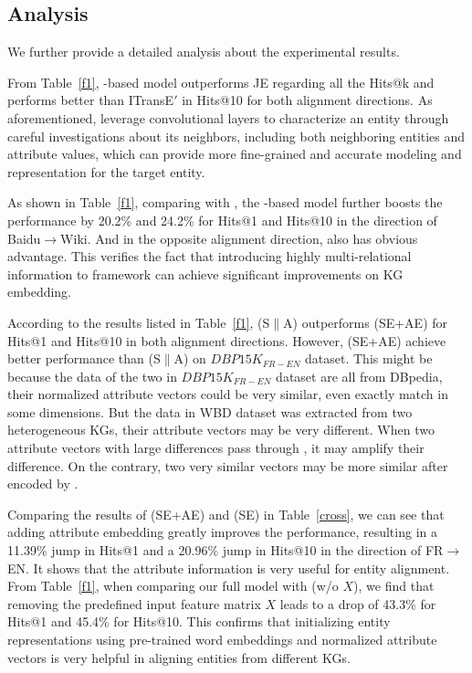 \subsection{Analysis}



We further provide a detailed analysis about the experimental results.

From Table~\ref{f1}, \GCN-based model outperforms JE regarding all the Hits@k and performs better than ITransE$'$ in Hits@10 for both alignment directions. As aforementioned, \GCNs leverage convolutional layers to characterize an entity through careful investigations about its neighbors, including both neighboring entities and attribute values, which can provide more fine-grained and accurate modeling and representation for the target entity.

 As shown in Table~\ref{f1}, comparing with \GCN, the \RGCN-based model further boosts the performance by 20.2\% and 24.2\% for Hits@1 and Hits@10 in the direction of Baidu$\rightarrow$Wiki. And in the opposite alignment direction, \RGCN also has obvious advantage. This verifies the fact that introducing highly multi-relational information to \GCN framework can achieve significant improvements on KG embedding.

According to the results listed in Table~\ref{f1}, \HRGCN (S$\|$A) outperforms \HRGCN (SE+AE) for Hits@1 and Hits@10 in both alignment directions. However, \HRGCN (SE+AE) achieve better performance than \HRGCN (S$\|$A) on $DBP15K_{FR-EN}$ dataset. This might be because the data of the two \KGs in $DBP15K_{FR-EN}$ dataset are all from DBpedia, their normalized attribute vectors could be very similar, even exactly match in some dimensions. But the data in WBD dataset was extracted from two heterogeneous KGs, their attribute vectors may be very different. When two attribute vectors with large differences pass through \HRGCNs, it may amplify their difference. On the contrary, two very similar vectors may be more similar after encoded by \HRGCNs.


Comparing the results of \HRGCN (SE+AE) and \HRGCN (SE) in Table~\ref{cross}, we can see that adding attribute embedding greatly improves the performance, resulting in a 11.39\% jump in Hits@1 and a 20.96\% jump in Hits@10 in the direction of FR$\rightarrow$EN. It shows that the attribute information is very useful for entity alignment. 
From Table~\ref{f1}, when comparing our full model \HRGCN with \HRGCN (w/o $X$), we find that removing the predefined input feature matrix $X$ leads to a drop of 43.3\% for Hits@1 and 45.4\% for Hits@10. This confirms that initializing entity representations using pre-trained word embeddings and normalized attribute vectors is very helpful in aligning entities from different KGs.


